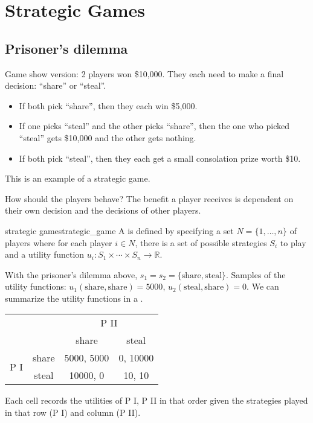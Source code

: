 \documentclass[12pt,letterpaper]{report}
\begin{document}

\section{Strategic Games}

\subsection{Prisoner's dilemma}

Game show version: 2 players won \$10,000.
They each need to make a final decision: ``share'' or ``steal''.
\begin{itemize}
  \item If both pick ``share'', then they each win \$5,000.
  \item If one picks ``steal'' and the other picks ``share'', then the one who picked ``steal'' gets
  \$10,000 and the other gets nothing.
  \item If both pick ``steal'', then they each get a small consolation prize worth \$10.
\end{itemize}

This is an example of a strategic game.

How should the players behave?
The benefit a player receives is dependent on their own decision and the decisions of other players.

\begin{defn}{strategic game}{strategic_game}
  A  is defined by specifying a set $N = \{1, \ldots, n\}$ of players where
  for each player $i \in N$, there is a set of possible strategies $S_i$ to play and a utility
  function $u_i : S_1 \times \cdots \times S_n \to \mathbb{R}$.
\end{defn}

\begin{ex}
  With the prisoner's dilemma above, $s_1 = s_2 = \{\text{share}, \text{steal}\}$.
  Samples of the utility functions: $u_1(\text{share}, \text{share}) = 5000$,
  $u_2(\text{steal}, \text{share}) = 0$.
  We can summarize the utility functions in a .

  \begin{center}
    \renewcommand{\arraystretch}{1.25}
    \begin{tabular}{c c |c|c|}
      \multicolumn{2}{c}{} & \multicolumn{2}{c}{P II} \\
      \multicolumn{2}{c}{} & \multicolumn{1}{c}{share} & \multicolumn{1}{c}{steal} \\
      \cline{3-4}
      \multirow{2}{*}{P I} & share & 5000, 5000 & 0, 10000 \\
      \cline{3-4}
      & steal & 10000, 0 & 10, 10 \\
      \cline{3-4}
    \end{tabular}
  \end{center}

  Each cell records the utilities of P I, P II in that order given the strategies played in that row
  (P I) and column (P II).
\end{ex}
\end{document}
